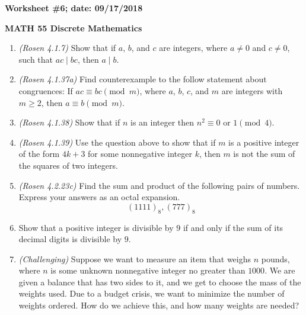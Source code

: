 \documentclass{article}
\begin{document}
{\bf Worksheet \#6; date: 09/17/2018}

{\bf MATH 55 Discrete Mathematics}

\begin{enumerate}
\item {\em (Rosen 4.1.7)} Show that if $a$, $b$, and $c$ are integers, where $a \ne 0$ and $c \ne 0$, such that $ac \mid bc$, then $a \mid b$.

\item {\em (Rosen 4.1.37a)} Find counterexample to the follow statement about congruences: If $ac \equiv bc \pmod{m}$, where $a$, $b$, $c$, and $m$ are integers with $m \ge 2$, then $a \equiv b \pmod{m}$.

\item {\em (Rosen 4.1.38)} Show that if $n$ is an integer then $n^2 \equiv 0 \text{ or } 1 \pmod{4}$.

\item {\em (Rosen 4.1.39)} Use the question above to show that if $m$ is a positive integer of the form $4k + 3$ for some nonnegative integer $k$, then $m$ is not the sum of the squares of two integers.

\item {\em (Rosen 4.2.23c)} Find the sum and product of the following pairs of numbers. Express your answers as an octal expansion.
\[
(1111)_8, (777)_8
\]

\item Show that a positive integer is divisible by $9$ if and only if the sum of its decimal digits is divisible by $9$.

\item {\em (Challenging)} Suppose we want to measure an item that weighs $n$ pounds, where $n$ is some unknown nonnegative integer no greater than $1000$. We are given a balance that has two sides to it, and we get to choose the mass of the weights used. Due to a budget crisis, we want to minimize the number of weights ordered. How do we achieve this, and how many weights are needed?
\end{enumerate}
\end{document}

